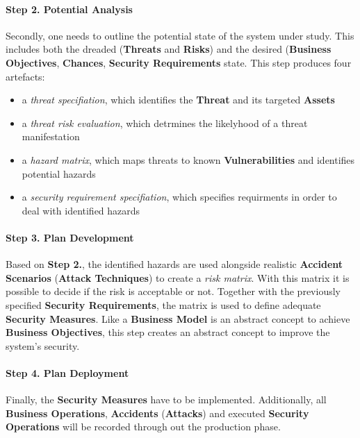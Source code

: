 \paragraph{Step 2. Potential Analysis}

Secondly, one needs to outline the potential state of the system under
study. This includes both the dreaded (\textbf{Threats} and
\textbf{Risks}) and the desired (\textbf{Business Objectives},
\textbf{Chances}, \textbf{Security Requirements} state. This step
produces four artefacts:

\begin{itemize}

\item
  a \emph{threat specifiation}, which identifies the \textbf{Threat} and
  its targeted \textbf{Assets}
\item
  a \emph{threat risk evaluation}, which detrmines the likelyhood of a
  threat manifestation
\item
  a \emph{hazard matrix}, which maps threats to known
  \textbf{Vulnerabilities} and identifies potential hazards
\item
  a \emph{security requirement specifiation}, which specifies
  requirments in order to deal with identified hazards
\end{itemize}

\paragraph{Step 3. Plan Development}

Based on \textbf{Step 2.}, the identified hazards are used alongside
realistic \textbf{Accident Scenarios} (\textbf{Attack Techniques}) to
create a \emph{risk matrix}. With this matrix it is possible to decide
if the risk is acceptable or not. Together with the previously specified
\textbf{Security Requirements}, the matrix is used to define adequate
\textbf{Security Measures}. Like a \textbf{Business Model} is an
abstract concept to achieve \textbf{Business Objectives}, this step
creates an abstract concept to improve the system's security.

\paragraph{Step 4. Plan Deployment}

Finally, the \textbf{Security Measures} have to be implemented.
Additionally, all \textbf{Business Operations}, \textbf{Accidents}
(\textbf{Attacks}) and executed \textbf{Security Operations} will be
recorded through out the production phase.

